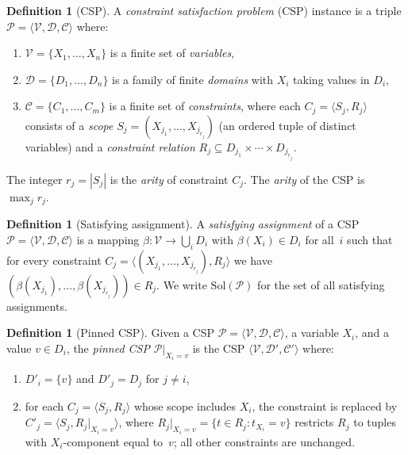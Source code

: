 \documentclass[11pt,a4paper]{article}
\theoremstyle{plain}
\theoremstyle{definition}
\newtheorem{definition}[theorem]{Definition}
\theoremstyle{remark}
\begin{document}
\begin{definition}[CSP]\label{def:csp}
A \emph{constraint satisfaction problem} (CSP) instance is a triple $\mathcal{P} = \langle \mathcal{V}, \mathcal{D}, \mathcal{C} \rangle$ where:
\begin{enumerate}[nosep,label=(\roman*)]
  \item $\mathcal{V} = \{X_1, \ldots, X_n\}$ is a finite set of \emph{variables},
  \item $\mathcal{D} = \{D_1, \ldots, D_n\}$ is a family of finite \emph{domains} with $X_i$ taking values in $D_i$,
  \item $\mathcal{C} = \{C_1, \ldots, C_m\}$ is a finite set of \emph{constraints}, where each $C_j = \langle S_j, R_j \rangle$ consists of a \emph{scope} $S_j = (X_{j_1}, \ldots, X_{j_{r_j}})$ (an ordered tuple of distinct variables) and a \emph{constraint relation} $R_j \subseteq D_{j_1} \times \cdots \times D_{j_{r_j}}$.
\end{enumerate}
The integer $r_j = |S_j|$ is the \emph{arity} of constraint $C_j$.
The \emph{arity} of the CSP is $\max_j r_j$.
\end{definition}

\begin{definition}[Satisfying assignment]\label{def:satisfying}
A \emph{satisfying assignment} of a CSP $\mathcal{P} = \langle \mathcal{V}, \mathcal{D}, \mathcal{C} \rangle$ is a mapping $\beta\colon \mathcal{V} \to \bigcup_i D_i$ with $\beta(X_i) \in D_i$ for all~$i$ such that for every constraint $C_j = \langle (X_{j_1}, \ldots, X_{j_{r_j}}), R_j \rangle$ we have $(\beta(X_{j_1}), \ldots, \beta(X_{j_{r_j}})) \in R_j$.
We write $\mathrm{Sol}(\mathcal{P})$ for the set of all satisfying assignments.
\end{definition}

\begin{definition}[Pinned CSP]\label{def:pinned}
Given a CSP $\mathcal{P} = \langle \mathcal{V}, \mathcal{D}, \mathcal{C} \rangle$, a variable $X_i$, and a value $v \in D_i$, the \emph{pinned CSP} $\mathcal{P}|_{X_i = v}$ is the CSP $\langle \mathcal{V}, \mathcal{D}', \mathcal{C}' \rangle$ where:
\begin{enumerate}[nosep,label=(\roman*)]
  \item $D'_i = \{v\}$ and $D'_j = D_j$ for $j \neq i$,
  \item for each $C_j = \langle S_j, R_j \rangle$ whose scope includes $X_i$, the constraint is replaced by $C'_j = \langle S_j, R_j|_{X_i = v} \rangle$, where $R_j|_{X_i = v} = \{t \in R_j : t_{X_i} = v\}$ restricts $R_j$ to tuples with $X_i$-component equal to~$v$; all other constraints are unchanged.
\end{enumerate}
\end{definition}
\end{document}
